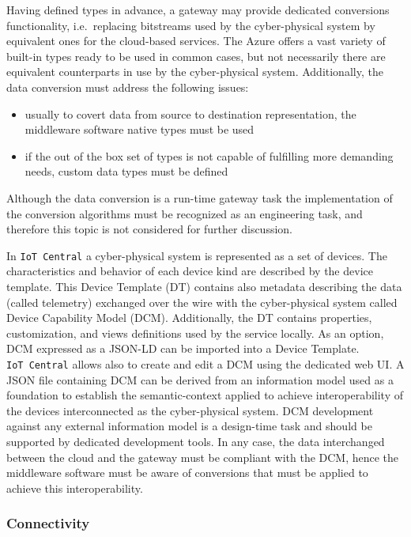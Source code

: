 \documentclass{jacsart}
\providecommand{\tightlist} { \setlength{\itemsep}{0pt}\setlength{\parskip}{0pt}}
\begin{document}
Having defined types in advance, a gateway may provide dedicated conversions functionality, i.e.~replacing bitstreams used by the cyber-physical system by equivalent ones for the cloud-based services. The Azure offers a vast variety of built-in types ready to be used in common cases, but not necessarily there are equivalent counterparts in use by the cyber-physical system. Additionally, the data conversion must address the following issues:

\begin{itemize}
\tightlist
\item
  usually to covert data from source to destination representation, the
  middleware software native types must be used
\item
  if the out of the box set of types is not capable of fulfilling more
  demanding needs, custom data types must be defined
\end{itemize}

Although the data conversion is a run-time gateway task the
implementation of the conversion algorithms must be recognized as an
engineering task, and therefore this topic is not considered for further
discussion.

In \texttt{IoT\ Central} a cyber-physical system is represented as a set
of devices. The characteristics and behavior of each device kind are
described by the device template. This Device Template (DT) contains
also metadata describing the data (called telemetry) exchanged over the
wire with the cyber-physical system called Device Capability Model
(DCM). Additionally, the DT contains properties, customization, and
views definitions used by the service locally. As an option, DCM
expressed as a JSON-LD can be imported into a Device Template.
\texttt{IoT\ Central} allows also to create and edit a DCM using the
dedicated web UI. A JSON file containing DCM can be derived from an
information model used as a foundation to establish the semantic-context
applied to achieve interoperability of the devices interconnected as the
cyber-physical system. DCM development against any external information
model is a design-time task and should be supported by dedicated
development tools. In any case, the data interchanged between the cloud
and the gateway must be compliant with the DCM, hence the middleware
software must be aware of conversions that must be applied to achieve
this interoperability.

\hypertarget{connectivity}{%
\subsubsection{Connectivity}\label{connectivity}}
\end{document}
